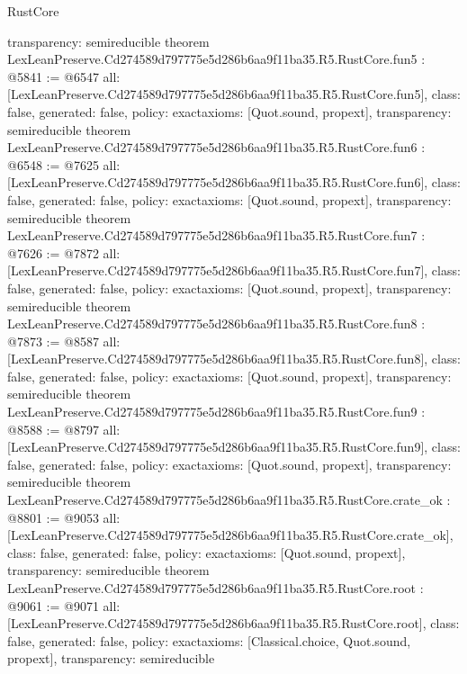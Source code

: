 \begin{lexlean}{RustCore}
\begin{coremodule}
{  transparency: semireducible
}
theorem LexLeanPreserve.Cd274589d797775e5d286b6aa9f11ba35.R5.RustCore.fun5 : @5841 := @6547 {
  all: [LexLeanPreserve.Cd274589d797775e5d286b6aa9f11ba35.R5.RustCore.fun5],
  class: false,
  generated: false,
  policy: exact{axioms: [Quot.sound, propext]},
  transparency: semireducible
}
theorem LexLeanPreserve.Cd274589d797775e5d286b6aa9f11ba35.R5.RustCore.fun6 : @6548 := @7625 {
  all: [LexLeanPreserve.Cd274589d797775e5d286b6aa9f11ba35.R5.RustCore.fun6],
  class: false,
  generated: false,
  policy: exact{axioms: [Quot.sound, propext]},
  transparency: semireducible
}
theorem LexLeanPreserve.Cd274589d797775e5d286b6aa9f11ba35.R5.RustCore.fun7 : @7626 := @7872 {
  all: [LexLeanPreserve.Cd274589d797775e5d286b6aa9f11ba35.R5.RustCore.fun7],
  class: false,
  generated: false,
  policy: exact{axioms: [Quot.sound, propext]},
  transparency: semireducible
}
theorem LexLeanPreserve.Cd274589d797775e5d286b6aa9f11ba35.R5.RustCore.fun8 : @7873 := @8587 {
  all: [LexLeanPreserve.Cd274589d797775e5d286b6aa9f11ba35.R5.RustCore.fun8],
  class: false,
  generated: false,
  policy: exact{axioms: [Quot.sound, propext]},
  transparency: semireducible
}
theorem LexLeanPreserve.Cd274589d797775e5d286b6aa9f11ba35.R5.RustCore.fun9 : @8588 := @8797 {
  all: [LexLeanPreserve.Cd274589d797775e5d286b6aa9f11ba35.R5.RustCore.fun9],
  class: false,
  generated: false,
  policy: exact{axioms: [Quot.sound, propext]},
  transparency: semireducible
}
theorem LexLeanPreserve.Cd274589d797775e5d286b6aa9f11ba35.R5.RustCore.crate_ok : @8801 := @9053 {
  all: [LexLeanPreserve.Cd274589d797775e5d286b6aa9f11ba35.R5.RustCore.crate_ok],
  class: false,
  generated: false,
  policy: exact{axioms: [Quot.sound, propext]},
  transparency: semireducible
}
theorem LexLeanPreserve.Cd274589d797775e5d286b6aa9f11ba35.R5.RustCore.root : @9061 := @9071 {
  all: [LexLeanPreserve.Cd274589d797775e5d286b6aa9f11ba35.R5.RustCore.root],
  class: false,
  generated: false,
  policy: exact{axioms: [Classical.choice, Quot.sound, propext]},
  transparency: semireducible
}


\end{coremodule}
\end{lexlean}
